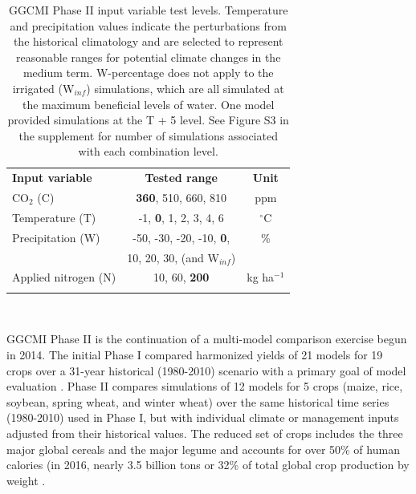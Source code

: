 \documentclass[esd, manuscript]{copernicus} %
\begin{document}
\begin{table}[t]
\caption{GGCMI Phase II input variable test levels. Temperature and precipitation values indicate the perturbations from the historical climatology and are selected to represent reasonable ranges for potential climate changes in the medium term.  W-percentage does not apply to the irrigated (W$_{inf}$) simulations, which are all simulated at the maximum beneficial levels of water. One model provided simulations at the T + 5 level. See Figure S3 in the supplement for number of simulations associated with each combination level.}
\label{table:inputs} 
    \begin{tabular}{lcc} 
        \tophline \vspace{1mm}
        \textbf{Input variable} & \textbf{Tested range} & \textbf{Unit} \\ \middlehline \vspace{1mm}
        CO$_2$ (C) & \textbf{360}, 510, 660, 810 & ppm\\ \middlehline \vspace{1mm}
        Temperature (T) & -1, \textbf{0}, 1, 2, 3, 4, 6 & $^{\circ}$C\\ \middlehline \vspace{1mm}
        Precipitation (W) & -50, -30, -20, -10, \textbf{0}, & \% \\
        {} & 10, 20, 30, (and W$_{inf}$) & {} \\ \middlehline \vspace{1mm}
        Applied nitrogen (N) & 10, 60, \textbf{200} & kg ha$^{-1}$ \\ \bottomhline
    \end{tabular}\\
\end{table}

GGCMI Phase II is the continuation of a multi-model comparison exercise begun in 2014. The initial Phase I compared harmonized yields of 21 models for 19 crops over a 31-year historical (1980-2010) scenario with a primary goal of model evaluation \citep{Elliott2015, muller_global_2017}. Phase II compares simulations of 12 models for 5 crops (maize, rice, soybean, spring wheat, and winter wheat) over the same historical time series (1980-2010) used in Phase I, but with individual climate or management inputs adjusted from their historical values. The reduced set of crops includes the three major global cereals and the major legume and accounts for over 50\% of human calories (in 2016, nearly 3.5 billion tons or 32\% of total global crop production by weight \citep{FAOSTAT}. 
\end{document}
